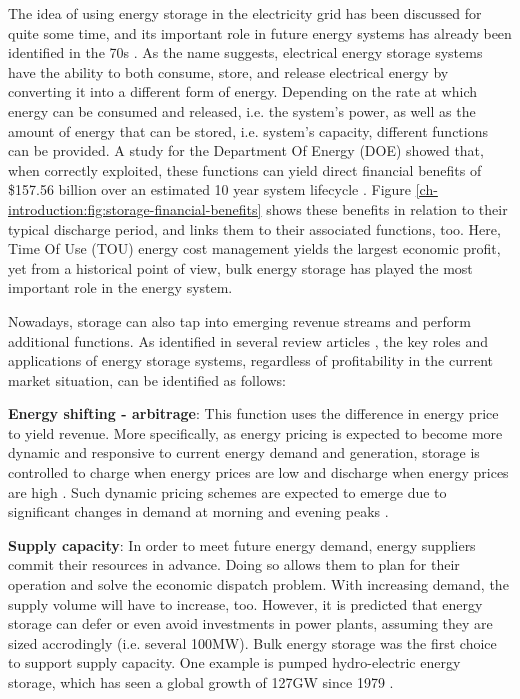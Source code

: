 The idea of using energy storage in the electricity grid has been discussed for quite some time, and its important role in future energy systems has already been identified in the 70s \cite{Kalhammer1979}.
As the name suggests, electrical energy storage systems have the ability to both consume, store, and release electrical energy by converting it into a different form of energy.
Depending on the rate at which energy can be consumed and released, i.e. the system's power, as well as the amount of energy that can be stored, i.e. system's capacity, different functions can be provided.
A study for the Department Of Energy (DOE) showed that, when correctly exploited, these functions can yield direct financial benefits of \$157.56 billion over an estimated 10 year system lifecycle \cite{Eyer2010a}.
Figure \ref{ch-introduction:fig:storage-financial-benefits} shows these benefits in relation to their typical discharge period, and links them to their associated functions, too.
Here, Time Of Use (TOU) energy cost management yields the largest economic profit, yet from a historical point of view, bulk energy storage has played the most important role in the energy system.

Nowadays, storage can also tap into emerging revenue streams and perform additional functions.
As identified in several review articles \cite{Chen2009, Katsanevakis2017, Guney2017}, the key roles and applications of energy storage systems, regardless of profitability in the current market situation, can be identified as follows:

\textbf{Energy shifting - arbitrage}: This function uses the difference in energy price to yield revenue.
More specifically, as energy pricing is expected to become more dynamic and responsive to current energy demand and generation, storage is controlled to charge when energy prices are low and discharge when energy prices are high \cite{Chen2009, Leou2012}.
Such dynamic pricing schemes are expected to emerge due to significant changes in demand at morning and evening peaks \cite{Koohi-Kamali2013}.

\textbf{Supply capacity}: In order to meet future energy demand, energy suppliers commit their resources in advance.
Doing so allows them to plan for their operation and solve the economic dispatch problem.
With increasing demand, the supply volume will have to increase, too.
However, it is predicted that energy storage can defer or even avoid investments in power plants, assuming they are sized accrodingly (i.e. several 100MW)\cite{Dobie1998}.
Bulk energy storage was the first choice to support supply capacity.
One example is pumped hydro-electric energy storage, which has seen a global growth of 127GW since 1979 \cite{Rehman2015, Barbour2015, Barbour2016}.

